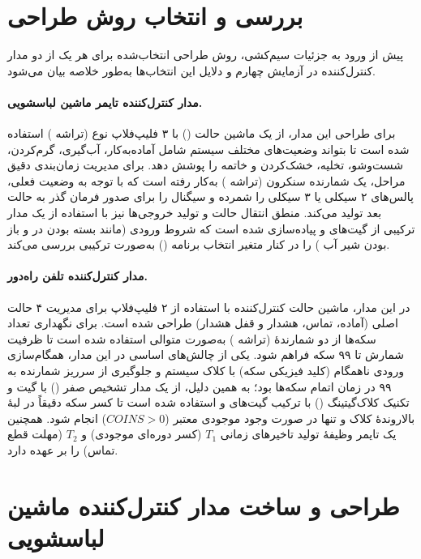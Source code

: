 \documentclass[12pt]{article}
\begin{document}
	\section{بررسی و انتخاب روش طراحی}
	
	پیش از ورود به جزئیات سیم‌کشی، روش طراحی انتخاب‌شده برای هر یک از دو مدار کنترل‌کننده در آزمایش چهارم و دلایل این انتخاب‌ها به‌طور خلاصه بیان می‌شود.
	
	\paragraph{مدار کنترل‌کننده تایمر ماشین لباسشویی.} 
	برای طراحی این مدار، از یک ماشین حالت () با ۳ فلیپ‌فلاپ نوع  (تراشه ) استفاده شده است تا بتواند وضعیت‌های مختلف سیستم شامل آماده‌به‌کار، آب‌گیری، گرم‌کردن، شست‌وشو، تخلیه، خشک‌کردن و خاتمه را پوشش دهد. برای مدیریت زمان‌بندی دقیق مراحل، یک شمارنده سنکرون (تراشه ) به‌کار رفته است که با توجه به وضعیت فعلی، پالس‌های ۲ سیکلی یا ۳ سیکلی را شمرده و سیگنال  را برای صدور فرمان گذر به حالت بعد تولید می‌کند. منطق انتقال حالت و تولید خروجی‌ها نیز با استفاده از یک مدار ترکیبی از گیت‌های  و  پیاده‌سازی شده است که شروط ورودی (مانند بسته بودن در  و باز بودن شیر آب ) را در کنار متغیر انتخاب برنامه () به‌صورت ترکیبی بررسی می‌کند.
	
	\paragraph{مدار کنترل‌کننده تلفن راه‌دور.} 
	در این مدار، ماشین حالت کنترل‌کننده با استفاده از ۲ فلیپ‌فلاپ  برای مدیریت ۴ حالت اصلی (آماده، تماس، هشدار و قفل هشدار) طراحی شده است. برای نگهداری تعداد سکه‌ها از دو شمارندهٔ  (تراشه ) به‌صورت متوالی استفاده شده است تا ظرفیت شمارش تا ۹۹ سکه فراهم شود. یکی از چالش‌های اساسی در این مدار، همگام‌سازی ورودی ناهمگام (کلید فیزیکی سکه) با کلاک سیستم و جلوگیری از سرریز شمارنده به ۹۹ در زمان اتمام سکه‌ها بود؛ به همین دلیل، از یک مدار تشخیص صفر () با گیت  و تکنیک کلاک‌گیتینگ () با ترکیب گیت‌های  و  استفاده شده است تا کسر سکه دقیقاً در لبهٔ بالاروندهٔ کلاک و تنها در صورت وجود موجودی معتبر ($COINS>0$) انجام شود. همچنین یک تایمر  وظیفهٔ تولید تاخیرهای زمانی $T_1$ (کسر دوره‌ای موجودی) و $T_2$ (مهلت قطع تماس) را بر عهده دارد.
	
	\section{طراحی و ساخت مدار کنترل‌کننده ماشین لباسشویی}
	
\end{document}
